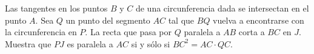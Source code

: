 Las tangentes en los puntos $B$ y $C$ de una circunferencia dada se intersectan en el punto $A$. Sea $Q$ un punto del segmento $AC$ tal que $BQ$ vuelva a encontrarse con la circunferencia en $P$. La recta que pasa por $Q$ paralela a $AB$ corta a $BC$ en $J$. Muestra que $PJ$ es paralela a $AC$ si y sólo si $BC^2 = AC\cdot QC$.
